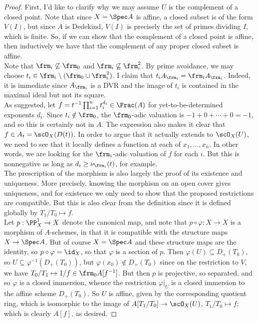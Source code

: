 \begin{proof}
	First, I'd like to clarify why we may assume $U$ is the complement of a closed point. Note that since $X = \Spec A$ is affine, a closed subset is of the form $V(I)$, but since $A$ is Dedekind, $V(I)$ is precisely the set of primes dividing $I$, which is finite. So, if we can show that the complement of a closed point is affine, then inductively we have that the complement of any proper closed subset is affine. \\
	
	Note that $\frm_i \not\subseteq \frm_0$ and $\frm_i \not\subseteq \frm_i^2$. By prime avoidance, we may choose $t_i \in \frm_i \setminus (\frm_0 \cup \frm_i^2)$. I claim that $t_iA_{\frm_i} = \frm_iA_{\frm_i}$. Indeed, it is immediate since $A_{\frm_i}$ is a DVR and the image of $t_i$ is contained in the maximal ideal but not its square. \\
	
	As suggested, let $f = t^{-1}\prod_{i=1}^n t_i^{d_i} \in \Frac(A)$ for yet-to-be-determined exponents $d_i$. Since $t_i \notin \frm_0$, the $\frm_0$-adic valuation is $-1+0+\cdots+0 = -1$, and so this is certainly not in $A$. The expression also makes it clear that $f \in A_t = \scO_X(D(t))$. In order to argue that it actually extends to $\scO_X(U)$, we need to see that it locally defines a function at each of $x_1,\ldots,x_n$. In other words, we are looking for the $\frm_i$-adic valuation of $f$ for each $i$. But this is nonnegative as long as $d_i \geq \nu_{\frm_i}(t)$, for example. \\
	
	The prescription of the morphism is also largely the proof of its existence and uniqueness. More precisely, knowing the morphism on an open cover gives uniqueness, and for existence we only need to show that the proposed restrictions are compatible. But this is also clear from the definition since it is defined globally by $T_1/T_0 \mapsto f$. \\
	
	Let $p : \PP^1_X \to X$ denote the canonical map, and note that $p \circ \varphi : X \to X$ is a morphism of $A$-schemes, in that it is compatible with the structure maps $X \to \Spec A$. But of course $X = \Spec A$ and these structure maps are the identity, so $p \circ \varphi = \id_X$, so that $\varphi$ is a section of $p$. Then $\varphi(U) \subseteq D_{+}(T_0)$, so $U \subseteq \varphi^{-1}(D_{+}(T_0))$, but $\varphi(x_0) \notin D_{+}(T_0)$ since on the restriction to $V$, we have $T_0/T_1 \mapsto 1/f \in \frm_0A[f^{-1}]$. But then $p$ is projective, so separated, and so $\varphi$ is a closed immersion, whence the restriction $\varphi|_U$ is a closed immersion to the affine scheme $D_{+}(T_0)$. So $U$ is affine, given by the corresponding quotient ring, which is isomorphic to the image of $A[T_1/T_0] \to \scO_X(U)$, $T_1/T_0 \mapsto f$; which is clearly $A[f]$, as desired.
\end{proof}
